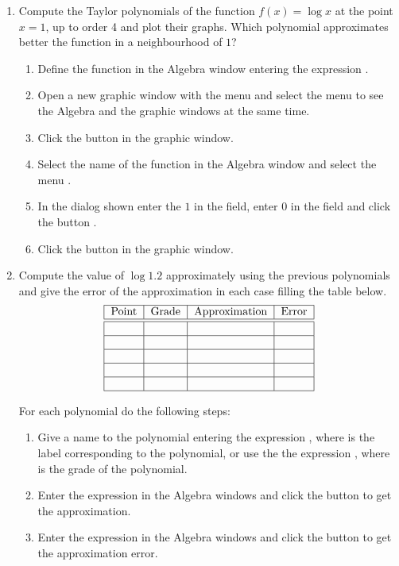 \begin{enumerate}[leftmargin=*]
\item Compute the Taylor polynomials of the function $f(x)=\log x$ at the point $x=1$, up to order 4 and plot their graphs.
Which polynomial approximates better the function in a neighbourhood of $1$?

\begin{indication}
\begin{enumerate}
\item Define the function in the Algebra window entering the expression .
\item Open a new graphic window with the menu  and select the menu  to see the Algebra and the graphic windows at the same time.
\item Click the button  in the graphic window.
\item Select the name of the function in the Algebra window and select the menu .
\item In the dialog shown enter the $1$ in the  field, enter 0 in the  field and click the button .
\item Click the button  in the graphic window.
\end{enumerate}
\end{indication}

\item Compute the value of $\log 1.2$ approximately using the previous polynomials and give the error of the approximation in each case filling the table below.
\[
\begin{tabular}{|c|c|c|c|}
\hline
Point & Grade & Approximation & Error \\
\hline\hline
&  &  &  \\ \hline
&  &  &  \\ \hline
&  &  &  \\ \hline
&  &  &  \\ \hline
&  &  &  \\ \hline
\end{tabular}
\]

\begin{indication}
For each polynomial do the following steps: 
\begin{enumerate}
\item Give a name to the polynomial entering the expression , where  is the label corresponding to the polynomial, or use the the expression , where  is the grade of the polynomial. 
\item Enter the expression  in the Algebra windows and click the button  to get the approximation. 
\item Enter the expression  in the Algebra windows and click the button  to get the approximation error.
\end{enumerate}
\end{indication}


\end{enumerate}
